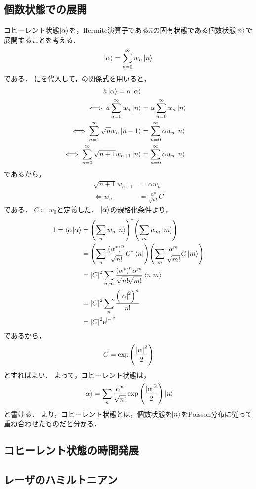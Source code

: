 \documentclass{report}
\begin{document}
  \subsection{個数状態での展開}
    コヒーレント状態$\ket{\alpha}$を，Hermite演算子である$\hat{n}$の固有状態である個数状態$\ket{n}$で展開することを考える．
    \begin{align}
      \ket{\alpha} = \sum_{n = 0}^{\infty}w_n\ket{n}\label{coherent-expantion}
    \end{align}
    である．
    にを代入して，の関係式を用いると，
    \begin{align}
      \hat{a}\ket{\alpha} = \alpha\ket{\alpha} \\ 
      \iff \hat{a}\sum_{n = 0}^{\infty}w_n\ket{n} &= \alpha\sum_{n = 0}^{\infty}w_n\ket{n} \\ 
      \iff \sum_{n = 1}^{\infty}\sqrt{n}w_n\ket{n - 1} &= \sum_{n = 0}^{\infty}\alpha w_n\ket{n} \\ 
      \iff \sum_{n = 0}^{\infty}\sqrt{n + 1}w_{n + 1}\ket{n} &= \sum_{n = 0}^{\infty}\alpha w_n\ket{n}
    \end{align}
    であるから，
    \begin{align}
      \sqrt{n + 1}w_{n + 1} &= \alpha w_n \\ 
      \iff w_n &= \frac{\alpha^n}{\sqrt{n!}}C
    \end{align}
    である．
    $C \coloneqq w_0$と定義した．
    $\ket{\alpha}$の規格化条件より，
    \begin{align}
      1 = \braket{\alpha}{\alpha} &= \qty(\sum_{n}w_n\ket{n})^{\dag}\qty(\sum_{m}w_m\ket{m}) \\ 
      &= \qty(\sum_{n}\frac{\qty(\alpha^*)^n}{\sqrt{n!}}C^*\bra{n})\qty(\sum_{m}\frac{\alpha^m}{\sqrt{m!}}C\ket{m}) \\ 
      &= \abs{C}^2\sum_{n, m}\frac{\qty(\alpha^*)^n\alpha^m}{\sqrt{n!}\sqrt{m!}}\braket{n}{m} \\ 
      &= \abs{C}^2\sum_{n}\frac{\qty(\abs{\alpha}^2)^n}{n!} \\ 
      &= \abs{C}^2\mathrm{e}^{\abs{\alpha}^2}
    \end{align}
    であるから，
    \begin{align}
      C = \exp\qty(\frac{\abs{\alpha}^2}{2})
    \end{align}
    とすればよい．
    よって，コヒーレント状態は，
    \begin{align}
      \ket{\alpha} = \sum_n \frac{\alpha^n}{\sqrt{n!}}\exp\qty(\frac{\abs{\alpha}^2}{2})\ket{n}\label{coherent-number-state-expantion}
    \end{align}
    と書ける．
    より，コヒーレント状態とは，個数状態を$\ket{n}$をPoisson分布に従って重ね合わせたものだと分かる．
  \subsection{コヒーレント状態の時間発展}
  \subsection{レーザのハミルトニアン}
\end{document}
